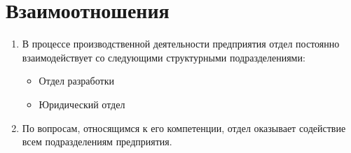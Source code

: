 \documentclass[a4paper,12pt]{article}
\begin{document}
\section{Взаимоотношения}

\begin{enumerate}
	\item  В процессе производственной деятельности предприятия отдел постоянно взаимодействует со следующими структурными подразделениями:
	\begin{itemize}
		\item Отдел разработки
		\item Юридический отдел
	\end{itemize}
	\item По вопросам, относящимся к его компетенции, отдел оказывает содействие всем подразделениям предприятия.
\end{enumerate}

\newpage
\pagestyle{plain}
\titleformat{\section}[block]{\Large\bfseries\filcenter}{\thesection}{1em}{}
\renewcommand*{\theenumi}{\thesection.\arabic{enumi}}
\renewcommand*{\theenumii}{\theenumi.\arabic{enumii}}

\setcounter{section}{0}


\vfill


\vfill
\end{document}
